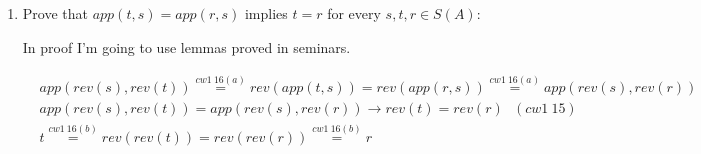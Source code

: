 \documentclass{article}
\begin{document}
\begin{enumerate}
\begin{enumerate}
\item $lh(rev(s)) = lh(s)$

To prove this let's use statement (b). Proof by induction.

\paragraph{Base $s = []$:}
$lh(rev([])) \stackrel{rev1}{=} lh([]) \stackrel{lh1}{=} 0 = lh([]) = lh(s)$

\paragraph{Inductive step:}
$lh(rev(x : s)) \stackrel{rev2}{=} lh(app(rev(s), [x])) \stackrel{(b)}{=} lh(rev(s)) + lh([x]) \stackrel{ind. hyp}{=} lh(s) + lh([x]) = lh([x]) + lh(s) \stackrel{(b)}{=} lh(app([x], s)) \stackrel{app2}{=} lh(x : app([], s)) \stackrel{app1}{=} lh(x : s)$

\end{enumerate}
\newpage

\item Prove that $app(t, s) = app(r, s)$ implies $t = r$ for every $s, t, r \in S(A)$:

In proof I'm going to use lemmas proved in seminars.

\begin{align*}
&app(rev(s), rev(t)) \stackrel{cw1 \: 16(a)}{=} rev(app(t, s)) = rev(app(r, s)) \stackrel{cw1 \: 16(a)}{=} app(rev(s), rev(r))\\
&app(rev(s), rev(t)) = app(rev(s), rev(r)) \to rev(t) = rev(r) \:\:\:(cw1 \: 15)\\
&t \stackrel{cw1 \: 16(b)}{=} rev(rev(t)) = rev(rev(r)) \stackrel{cw1 \: 16(b)}{=} r
\end{align*}

\end{enumerate}
\end{document}
